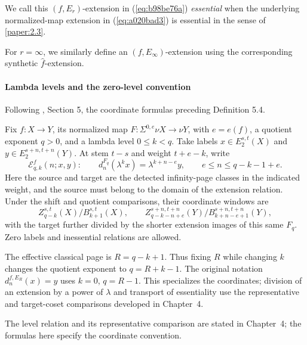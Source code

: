 \begin{definition}
    We call this $(f,E_r)$-extension in (\ref{eq:b98be76a}) \emph{essential} when the underlying normalized-map extension in (\ref{eq:a020bad3}) is essential in the sense of \ref{paper:2.3}.

    For $r=\infty$, we similarly define an $(f,E_\infty)$-extension using the corresponding synthetic $\hat f$-extension.





\end{definition}

\paragraph*{Lambda levels and the zero-level convention}
Following \cite{LWX126}, Section 5, the coordinate formulas preceding
Definition 5.4.\par
Fix $f:X\to Y$, its normalized map
$F:\Sigma^{0,e}\nu X\to\nu Y$, with $e=e(f)$, a quotient exponent
$q>0$, and a lambda level $0\leq k<q$. Take labels
$x\in E_2^{s,t}(X)$ and $y\in E_2^{s+n,t+n}(Y)$.
At stem $t-s$ and weight $t+e-k$, write
\[
\mathcal E^f_{q,k}(n;x,y):\qquad
d_n^{F_q}(\lambda^kx)=\lambda^{k+n-e}y,
\qquad e\leq n\leq q-k-1+e.
\]
Here the source and target are the detected infinity-page classes in
the indicated weight, and the source must belong to the domain of the
extension relation. Under the shift and quotient comparisons, their
coordinate windows are
\[
Z_{q-k}^{s,t}(X)/B_{k+1}^{s,t}(X),\qquad
Z_{q-k-n+e}^{s+n,t+n}(Y)/B_{k+n-e+1}^{s+n,t+n}(Y),
\]
with the target further divided by the shorter extension images of this
same $F_q$. Zero labels and inessential relations are allowed.

The effective classical page is $R=q-k+1$. Thus fixing $R$ while
changing $k$ changes the quotient exponent to $q=R+k-1$. The original
notation $d_n^{f,E_R}(x)=y$ uses $k=0$, $q=R-1$. This specializes the coordinates; division of an extension by a power
of $\lambda$ and transport of essentiality use the representative and
target-coset comparisons developed in Chapter~4.

The level relation and its representative comparison are stated in
Chapter~4; the formulas here specify the coordinate convention.

